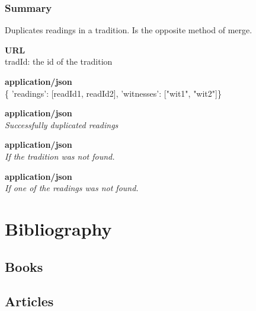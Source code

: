 \documentclass[11pt,fleqn,openany]{book} %
\begin{document}
\subsection*{Summary}
Duplicates readings in a tradition. Is the opposite method of merge.
\begin{parameter}\textbf{URL}\\
tradId: the id of the tradition \\
\end{parameter}
\begin{parameter}
\textbf{application/json}\\
\{  'readings': [readId1, readId2], 'witnesses': ["wit1", "wit2"]\}
\end{parameter}
\begin{return}[OK]
\textbf{application/json}\\
\textit{Successfully duplicated readings}
\end{return}
\begin{return}
\textbf{application/json}\\
\textit{If the tradition was not found. }
\end{return}
\begin{return}
\textbf{application/json}\\
\textit{If one of the readings was not found. }
\end{return}




\chapter*{Bibliography}
\section*{Books}
\printbibliography[heading=bibempty,type=book]
\section*{Articles}
\printbibliography[heading=bibempty,type=article]


\cleardoublepage
{}
\setlength{\columnsep}{0.75cm}
\printindex

\end{document}
